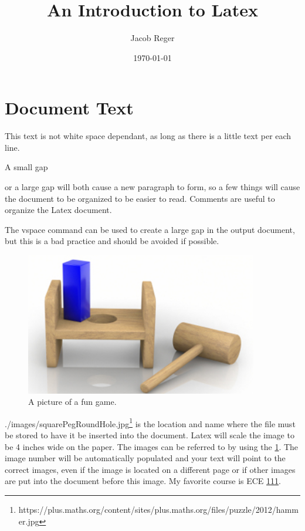 \documentclass{article}
\title{An Introduction to Latex}
\author{Jacob Reger}
\date{\today}
\begin{document}
\maketitle

\section{Document Text}

This text is                                               not 
white
space                                          dependant,
as                long
as
there          is
a
little 					text per each line. 

 A small gap




or a large gap will both cause a new
paragraph to form, so a few things will cause the document to be organized to be easier to read.  
Comments are useful to organize the Latex document.  %
\vspace{1 in} 

The vspace command can be used to create a large gap in the output document, but this is a bad practice and should be avoided if possible.

\begin{figure}
  \caption{A picture of a fun game.}
  \label{pegGame}
  \centering
  \includegraphics[width = 4in]{./images/squarePegRoundHole.jpg}
\end{figure}


./images/squarePegRoundHole.jpg\footnote{https://plus.maths.org/content/sites/plus.maths.org/files/puzzle/2012/hammer.jpg} is the location and name where the file must be stored to have it be inserted into the document.  Latex will scale the image to be 4 inches wide on the paper.  The images can be referred to by using the \ref{pegGame}.  The image number will be automatically populated and your text will point to the correct images, even if the image is located on a different page or if other images are put into the document before this image.  
 My favorite course is ECE \ref{pegGame}\ref{pegGame}\ref{pegGame}. 
\end{document}

